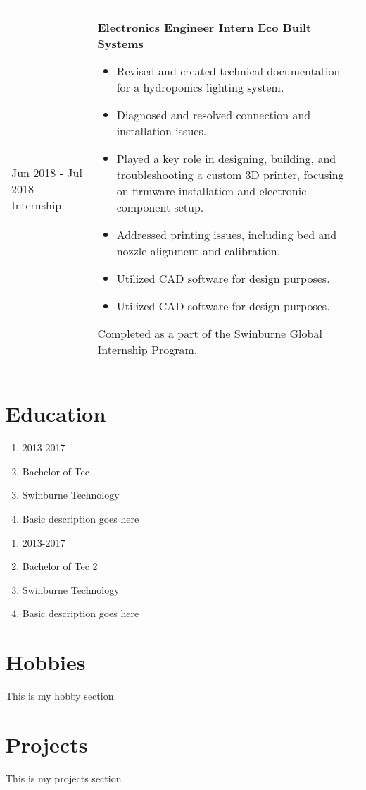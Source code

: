 \documentclass[10pt]{article}
\begin{document}
\begin{longtable}[H]{l l}
	\parbox[t]{0.175\textwidth}{
		Jun 2018 - Jul 2018
		Internship
	}
	&
	\parbox[t]{0.825\textwidth}{
		\textbf{Electronics Engineer Intern}
		\hfill
		{\footnotesize \textbf{Eco Built Systems}}\\
		\begin{itemize}
			\item Revised and created technical documentation for a hydroponics lighting system.
			\item Diagnosed and resolved connection and installation issues.
			\item  Played a key role in designing, building, and troubleshooting a custom 3D printer, focusing on firmware installation and electronic component setup.
			\item Addressed printing issues, including bed and nozzle alignment and calibration.
			\item Utilized CAD software for design purposes.
			\item Utilized CAD software for design purposes.
		\end{itemize}
		Completed as a part of the Swinburne Global Internship Program.
	}
	\\
\end{longtable}

\section{Education}
\begin{enumerate}
	\item 2013-2017
	\item Bachelor of Tec
	\item Swinburne Technology
	\item Basic description goes here
\end{enumerate}
\begin{enumerate}
	\item 2013-2017
	\item Bachelor of Tec 2
	\item Swinburne Technology
	\item Basic description goes here
\end{enumerate}

\section{Hobbies}
This is my hobby section.

\section{Projects}
This is my projects section
\end{document}
